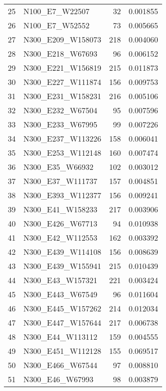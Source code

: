 \begin{table}
\begin{tabular}{llrr}
25 &      N100\_E7\_W22507 &    32 &          0.001855 \\
26 &      N100\_E7\_W52552 &    73 &          0.005665 \\
27 &   N300\_E209\_W158073 &   218 &          0.004060 \\
28 &    N300\_E218\_W67693 &    96 &          0.006152 \\
29 &   N300\_E221\_W156819 &   215 &          0.011873 \\
30 &   N300\_E227\_W111874 &   156 &          0.009753 \\
31 &   N300\_E231\_W158231 &   216 &          0.005106 \\
32 &    N300\_E232\_W67504 &    95 &          0.007596 \\
33 &    N300\_E233\_W67995 &    99 &          0.007226 \\
34 &   N300\_E237\_W113226 &   158 &          0.006041 \\
35 &   N300\_E253\_W112148 &   160 &          0.007474 \\
36 &     N300\_E35\_W66932 &   102 &          0.003012 \\
37 &    N300\_E37\_W111737 &   157 &          0.004851 \\
38 &   N300\_E393\_W112377 &   156 &          0.009241 \\
39 &    N300\_E41\_W158233 &   217 &          0.003906 \\
40 &    N300\_E426\_W67713 &    94 &          0.010938 \\
41 &    N300\_E42\_W112553 &   162 &          0.003392 \\
42 &   N300\_E439\_W114108 &   156 &          0.008639 \\
43 &   N300\_E439\_W155941 &   215 &          0.010439 \\
44 &    N300\_E43\_W157321 &   221 &          0.003424 \\
45 &    N300\_E443\_W67549 &    96 &          0.011604 \\
46 &   N300\_E445\_W157262 &   214 &          0.012034 \\
47 &   N300\_E447\_W157644 &   217 &          0.006738 \\
48 &    N300\_E44\_W113112 &   159 &          0.004555 \\
49 &   N300\_E451\_W112128 &   155 &          0.069517 \\
50 &    N300\_E466\_W67544 &    97 &          0.008810 \\
51 &     N300\_E46\_W67993 &    98 &          0.003879 \\

\end{tabular}
\end{table}
